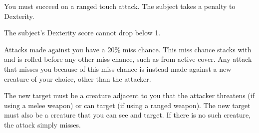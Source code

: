 \spellrng{\rngclose}
\spelldur{\durshort}
\begin{spelleffect}
  You must succeed on a ranged touch attack. The subject takes a  penalty to Dexterity.
\end{spelleffect}
\begin{spellnotes}
  The subject's Dexterity score cannot drop below 1.
\end{spellnotes}

\begin{comment}
\spellsection{Ray of Exhaustion}
\spelldesc{You fire a black ray at your foe, depleting his stamina.}
\spellschool{Necromancy (Flesh)}
\spelllvl{Sor/Wiz 3}
\spellrng{\rngclose}
\spelleff{Ray}
\spelldur{\durmed}
\spellsave{Fortitude partial; see text}
\spellsr{Yes (Fortitude)}
\begin{spelleffect}
  If you succeed on a ranged touch attack with the ray, the subject is immediately exhausted. A successful Fortitude save means the creature is only fatigued.
\end{spelleffect}
\begin{spellnotes}
  A creature that is already fatigued instead becomes exhausted. A creature that is already exhausted suffers no further penalties. Unlike normal exhaustion or fatigue, the effect ends as soon as the spell's duration expires.
\end{spellnotes}
\end{comment}

\begin{spelleffect}
  Attacks made against you have a 20\% miss chance. This miss chance stacks with and is rolled before any other miss chance, such as from active cover. Any attack that misses you because of this miss chance is instead made against a new creature of your choice, other than the attacker.
  \par The new target must be a creature adjacent to you that the attacker threatens (if using a melee weapon) or can target (if using a ranged weapon). The new target must also be a creature that you can see and target. If there is no such creature, the attack simply misses.
\end{spelleffect}

